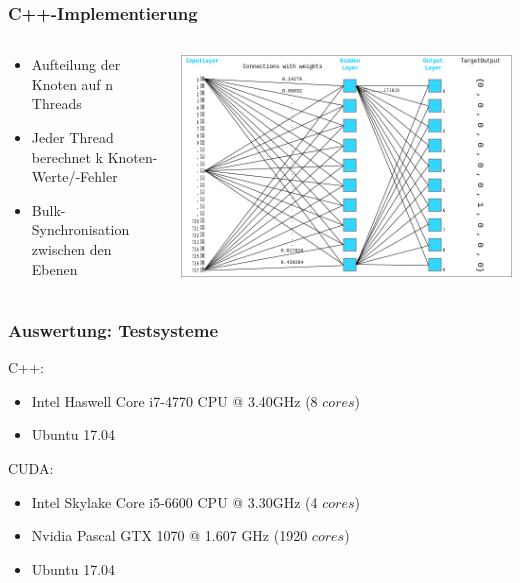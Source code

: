 \documentclass[xcolor=pdftex,dvipsnames,table]{beamer}
\begin{document}
	\begin{frame}
		\frametitle{C++-Implementierung}
		\begin{columns}
			\begin{column}{0.5\textwidth}
				\begin{itemize}
					\item Aufteilung der Knoten auf n Threads
					\item Jeder Thread berechnet k Knoten-Werte/-Fehler
					\item Bulk-Synchronisation zwischen den Ebenen
				\end{itemize}
			\end{column}
			\begin{column}{0.6\textwidth}
				\includegraphics[width=1\textwidth]{nn.png}
			\end{column}
		\end{columns}
	\end{frame}





	\begin{frame}
	\frametitle{Auswertung: Testsysteme}
		C++:
		\begin{itemize}
			\item Intel Haswell Core i7-4770 CPU @ 3.40GHz (8 $cores$)
			\item Ubuntu 17.04
		\end{itemize}
		
		
		CUDA:
		\begin{itemize}
			\item Intel Skylake Core i5-6600 CPU @ 3.30GHz (4 $cores$)
			\item Nvidia Pascal GTX 1070 @ 1.607 GHz (1920 $cores$)
			\item Ubuntu 17.04 
		\end{itemize}
	\end{frame}
\end{document}
